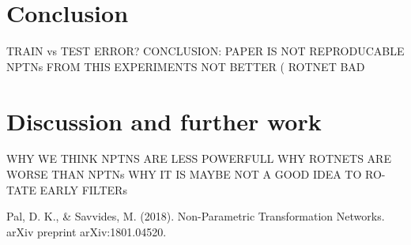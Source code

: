 \documentclass{llncs}
\begin{document}
\section{Conclusion}
TRAIN vs TEST ERROR?
CONCLUSION: PAPER IS NOT REPRODUCABLE NPTNs FROM THIS
EXPERIMENTS NOT BETTER ( ROTNET BAD
\section{Discussion and further work}
WHY WE THINK NPTNS ARE LESS POWERFULL WHY ROTNETS ARE
WORSE THAN NPTNs WHY IT IS MAYBE NOT A GOOD IDEA TO RO-
TATE EARLY FILTERs
%
%
\begin{thebibliography}{}
%
Pal, D. K., \& Savvides, M. (2018). Non-Parametric Transformation Networks. arXiv preprint arXiv:1801.04520.



\end{thebibliography}
%
\end{document}
